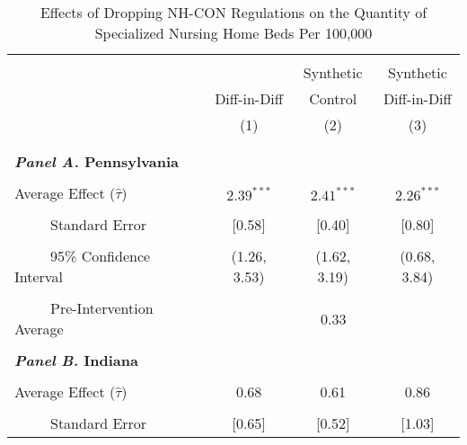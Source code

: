 \documentclass[../Main.tex]{subfiles}
\begin{document}
\newpage
\null
\vfill
\begin{table}[htbp]\centering \footnotesize
\def\sym#1{\ifmmode^{#1}\else\(^{#1}\)\fi}
\captionsetup{width=.75\textwidth}
\caption{\centering Effects of Dropping NH-CON Regulations on the Quantity of Specialized Nursing Home Beds Per 100,000}
\label{tab:ave_results_q_specbeds_nobord_nocov}
\setlength{\tabcolsep}{10pt}
\begin{tabular}{l*{3}{c}}
\hline\hline
\\[-2ex]
&\multicolumn{1}{c}{}&\multicolumn{1}{c}{Synthetic}&\multicolumn{1}{c}{Synthetic}\\
&\multicolumn{1}{c}{Diff-in-Diff}&\multicolumn{1}{c}{Control}&\multicolumn{1}{c}{Diff-in-Diff}\\
&\multicolumn{1}{c}{(1)}&\multicolumn{1}{c}{(2)}&\multicolumn{1}{c}{(3)}\\
\\[-2ex]
\hline
\\[-.1ex]
\multicolumn{4}{l}{\textbf{\textit{Panel A.} Pennsylvania}}\\
\\[-1.5ex]
\multicolumn{1}{l}{Average Effect ($\hat{\tau}$)}&   \multicolumn{1}{c}{$2.39^{***}$}&   \multicolumn{1}{c}{$2.41^{***}$}&  \multicolumn{1}{c}{$2.26^{***}$}\\
\\[-2ex]
\multicolumn{1}{l}{\ \ \ \ \ Standard Error}  &\multicolumn{1}{c}{[0.58]}&\multicolumn{1}{c}{[0.40]}&\multicolumn{1}{c}{[0.80]}\\
\\[-2ex]
\multicolumn{1}{l}{\ \ \ \ \ 95\% Confidence Interval}&   \multicolumn{1}{c}{(1.26, 3.53)}&   \multicolumn{1}{c}{(1.62, 3.19)}&   \multicolumn{1}{c}{(0.68, 3.84)}\\
\\[-2ex]
\multicolumn{1}{l}{\ \ \ \ \ Pre-Intervention Average}&   \multicolumn{3}{c}{0.33}\\
\\[-.1ex]
\multicolumn{4}{l}{\textbf{\textit{Panel B.} Indiana}}\\
\\[-1.5ex]
\multicolumn{1}{l}{Average Effect ($\hat{\tau}$)}&   \multicolumn{1}{c}{0.68}&   \multicolumn{1}{c}{0.61} &  \multicolumn{1}{c}{0.86}\\
\\[-2ex]
\multicolumn{1}{l}{\ \ \ \ \ Standard Error}  &\multicolumn{1}{c}{[0.65]}&\multicolumn{1}{c}{[0.52]}&\multicolumn{1}{c}{[1.03]}\\

\end{tabular}
\end{table}
\end{document}
